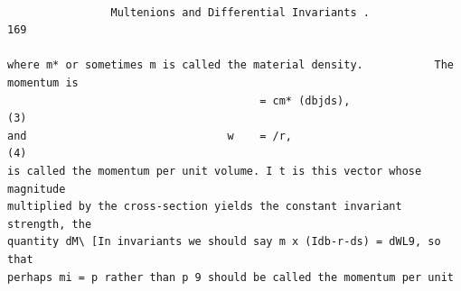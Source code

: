 \documentclass[10pt]{article}
\begin{document}
\clearpage
\begin{verbatim}

                Multenions and Differential Invariants .                           169

where m* or sometimes m is called the material density.           The momentum is
                                       = cm* (dbjds),                               (3)
and                               w    = /r,                                        (4)
is called the momentum per unit volume. I t is this vector whose magnitude
multiplied by the cross-section yields the constant invariant strength, the
quantity dM\ [In invariants we should say m x (Idb-r-ds) = dWL9, so that
perhaps mi = p rather than p 9 should be called the momentum per unit





\end{verbatim}
\end{document}
